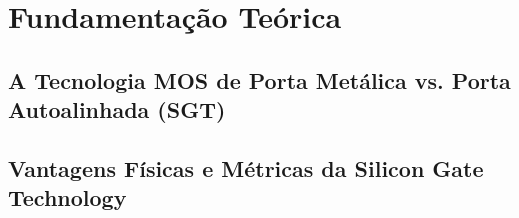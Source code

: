 
\section{Fundamentação Teórica}
\label{sec:fundamentacao}


\subsection{A Tecnologia MOS de Porta Metálica vs. Porta Autoalinhada (SGT)}
\label{subsec:mos_sgt}


\subsection{Vantagens Físicas e Métricas da Silicon Gate Technology}
\label{subsec:vantagens_sgt}

